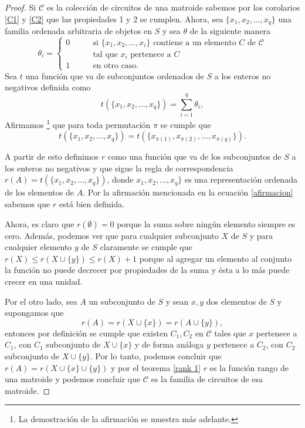 \begin{proof}
Si $\mathcal{C}$ es la colección de circuitos de una matroide sabemos por los corolarios \ref{C1} y \ref{C2} que las propiedades 1 y 2 se cumplen. 
Ahora, sea $\{x_1,x_2,\dots,x_q\}$ una familia ordenada arbitraria de objetos en $S$ y sea $\theta$ de la siguiente manera 
$$\theta_{i}= 
\begin{cases}
0 & \qquad \text{si $\{x_1,x_2,\dots,x_i\}$ contiene a un elemento $C$ de $\mathcal{C}$} \\
& \qquad \text{tal que $x_i$ pertenece a $C$} \\
1 &\qquad\text{en otro caso.} 
\end{cases} $$
Sea $t$ una función que va de subconjuntos ordenados de $S$ a los enteros no negativos definida como 
\begin{equation} \label{funcic}
t(\{x_1,x_2,\dots,x_q\}) = \sum_{i=1}^{q}\theta_i,
\end{equation}
Afirmamos \footnote{La demostración de la afirmación se muestra más adelante.} que para toda permutación $\pi$ se cumple que 
\begin{equation} \label{afirmacion}
t(\{x_1,x_2,\dots,x_q\}) = t(\{x_{\pi(1)},x_{\pi(2)},\dots,x_{\pi(q)}\}).
\end{equation}


A partir de esto definimos $r$ como una función que va de los subconjuntos de $S$ a los enteros no negativos y que sigue la regla de correspondencia $r(A) = t(\{x_1,x_2,\dots,x_q\})$, donde $x_1,x_2,\dots,x_q\}$ es una representación ordenada de los elementos de $A$. Por la afirmación mencionada en la ecuación \ref{afirmacion} sabemos que $r$ está bien definida. 

Ahora, es claro que $r(\emptyset)=0$ porque la suma sobre ningún elemento siempre es cero. Además, podemos ver que para cualquier subconjunto $X$ de $S$ y para cualquier elemento $y$ de $S$ claramente se cumple que $r(X)\leq r(X \cup \{y\}) \leq r(X) + 1$ porque al agregar un elemento al conjunto la función no puede decrecer por propiedades de la suma y ésta a lo más puede crecer en una unidad. 

Por el otro lado, sea $A$ un subconjunto de $S$ y sean $x,y$ dos elementos de $S$ y supongamos que 
$$r(A)= r(X \cup \{x\}) = r(A \cup \{y\}),$$
entonces por definición se cumple que existen $C_1,C_2$ en $\mathcal{C}$ tales que $x$ pertenece a $C_1$, con $C_1$ subconjunto de $X \cup \{x\}$ y de forma análoga $y$ pertenece a $C_2$, con $C_2$ subconjunto de $X \cup \{y\}$. Por lo tanto, podemos concluir que $r(A)= r(X \cup \{x\} \cup \{y\})$ y por el teorema \ref{rank 1} $r$ es la función rango de una matroide y podemos concluir que $\mathcal{C}$ es la familia de circuitos de esa matroide.
\end{proof}

